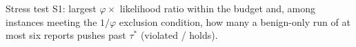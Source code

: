 \begin{table}[!htbp]
\centering
\caption{Stress test S1: largest $\varphi\times$ likelihood ratio within the budget and, among instances meeting the $1/\varphi$ exclusion condition, how many a benign-only run of at most six reports pushes past $\tau^*$ (violated / holds).}
\label{tab:s1-check}
\scriptsize
\setlength{\tabcolsep}{3pt}
\resizebox{\linewidth}{!}{}
\end{table}
